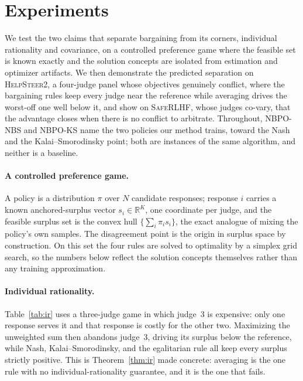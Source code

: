 \documentclass[letterpaper]{article} %
\newcommand{\R}{\mathbb{R}}
\begin{document}
\section{Experiments}
\label{sec:exp}
We test the two claims that separate bargaining from its corners, individual rationality and covariance, on a controlled preference game where the feasible set is known exactly and the solution concepts are isolated from estimation and optimizer artifacts. We then demonstrate the predicted separation on \textsc{HelpSteer2}, a four-judge panel whose objectives genuinely conflict, where the bargaining rules keep every judge near the reference while averaging drives the worst-off one well below it, and show on \textsc{SafeRLHF}, whose judges co-vary, that the advantage closes when there is no conflict to arbitrate. Throughout, NBPO-NBS and NBPO-KS name the two policies our method trains, toward the Nash and the Kalai--Smorodinsky point; both are instances of the same algorithm, and neither is a baseline.

\paragraph{A controlled preference game.}
A policy is a distribution $\pi$ over $N$ candidate responses; response $i$ carries a known anchored-surplus vector $s_i\in\R^K$, one coordinate per judge, and the feasible surplus set is the convex hull $\{\sum_i\pi_i s_i\}$, the exact analogue of mixing the policy's own samples. The disagreement point is the origin in surplus space by construction. On this set the four rules are solved to optimality by a simplex grid search, so the numbers below reflect the solution concepts themselves rather than any training approximation.

\paragraph{Individual rationality.}
Table~\ref{tab:ir} uses a three-judge game in which judge~3 is expensive: only one response serves it and that response is costly for the other two. Maximizing the unweighted sum then abandons judge~3, driving its surplus below the reference, while Nash, Kalai--Smorodinsky, and the egalitarian rule all keep every surplus strictly positive. This is Theorem~\ref{thm:ir} made concrete: averaging is the one rule with no individual-rationality guarantee, and it is the one that fails.
\end{document}
